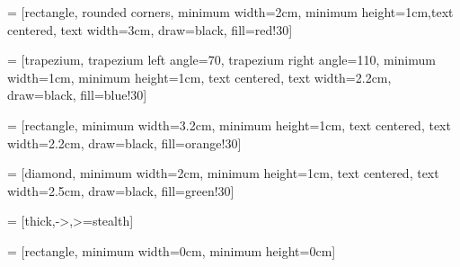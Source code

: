 %
%
%
%
% 



\usepackage{tikz}
\usetikzlibrary{shapes.geometric, arrows}

 = [rectangle, rounded corners, minimum width=2cm, minimum height=1cm,text centered, text width=3cm, draw=black, fill=red!30] 

 = [trapezium, trapezium left angle=70, trapezium right angle=110, minimum width=1cm, minimum height=1cm, text centered, text width=2.2cm, draw=black, fill=blue!30]

 = [rectangle, minimum width=3.2cm, minimum height=1cm, text centered, text width=2.2cm, draw=black, fill=orange!30]

 = [diamond, minimum width=2cm, minimum height=1cm, text centered, text width=2.5cm, draw=black, fill=green!30]

 = [thick,->,>=stealth]

 = [rectangle, minimum width=0cm, minimum height=0cm]




\frontmatter
\pagestyle{empty} %



\pagestyle{fancy} %
\tableofcontents


\cleardoublepage

